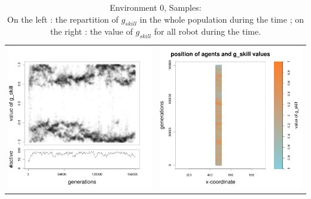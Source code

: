 \documentclass[a4paper,10pt]{article}
\begin{document}
\begin{table}[H]
\caption{Environment 0, Samples:\\On the left : the repartition of $g_{skill}$ in the whole population during the time ; on the right : the value of $g_{skill}$ for all robot during the time. }
\centering
\begin{tabular}{cc}
\includegraphics[width=\imgSize]{../images/5StaticEnv/Gplot59_staticEnv0}&\includegraphics[width=\imgSize]{../images/5StaticEnv/Gplot59Static_staticEnv0}\\

\end{tabular}
\end{table}
\end{document}

